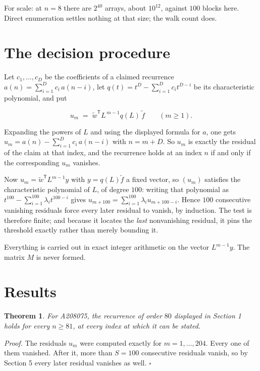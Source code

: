 \documentclass[11pt]{article}
\newtheorem{theorem}{Theorem}
\theoremstyle{definition}
\begin{document}
For scale: at $n = 8$ there are $2^{40}$ arrays, about $10^{12}$, against $100$ blocks here. Direct enumeration settles nothing at that size; the walk count does.

\section{The decision procedure}

Let $c_1,\dots,c_D$ be the coefficients of a claimed recurrence $a(n) = \sum_{i=1}^{D} c_i\,a(n-i)$, let $q(t) = t^{D} - \sum_{i=1}^{D} c_i t^{D-i}$ be its characteristic polynomial, and put

\[u_m \;=\; \tilde w^{\mathsf T} L^{\,m-1} q(L)\,\tilde f \qquad (m \ge 1).\]

Expanding the powers of $L$ and using the displayed formula for $a$, one gets $u_m = a(n) - \sum_{i=1}^{D} c_i\,a(n-i)$ with $n = m + D$. So $u_m$ is exactly the residual of the claim at that index, and the recurrence holds at an index $n$ if and only if the corresponding $u_m$ vanishes.

Now $u_m = \tilde w^{\mathsf T} L^{m-1} y$ with $y = q(L)\tilde f$ a fixed vector, so $(u_m)$ satisfies the characteristic polynomial of $L$, of degree $100$: writing that polynomial as $t^{100} - \sum_{i=1}^{100} \lambda_i t^{100-i}$ gives $u_{m+100} = \sum_{i=1}^{100} \lambda_i u_{m+100-i}$. Hence $100$ consecutive vanishing residuals force every later residual to vanish, by induction. The test is therefore finite; and because it locates the {\itshape last} nonvanishing residual, it pins the threshold exactly rather than merely bounding it.

Everything is carried out in exact integer arithmetic on the vector $L^{m-1}y$. The matrix $M$ is never formed.

\section{Results}

\begin{theorem} For A208075, the recurrence of order $80$ displayed in Section 1 holds for every $n \ge 81$, at every index at which it can be stated.\end{theorem}

{\itshape Proof.} The residuals $u_m$ were computed exactly for $m = 1,\dots,204$. Every one of them vanished. After it, more than $S = 100$ consecutive residuals vanish, so by Section 5 every later residual vanishes as well. $\square$
\end{document}
